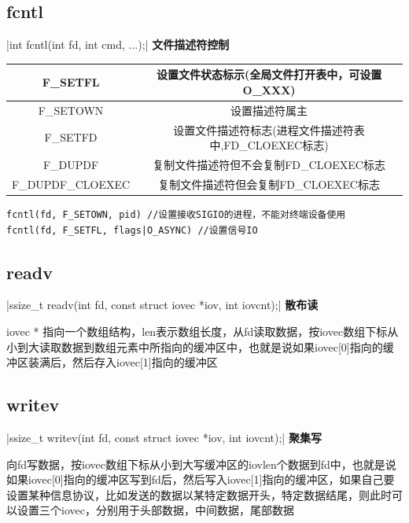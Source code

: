 \subsection{fcntl}
|int fcntl(int fd, int cmd, ...);|
\noindent \textbf{文件描述符控制}
\begin{spacing}{2.0}
\begin{table}[!htb]
	\begin{tabular}{|c|c|}
	\hline
		F\_SETFL & 设置文件状态标示(全局文件打开表中，可设置O\_XXX) \\
	\hline
		F\_SETOWN & 设置描述符属主 \\
	\hline
		F\_SETFD & 设置文件描述符标志(进程文件描述符表中,FD\_CLOEXEC标志)\\
	\hline
		F\_DUPDF & 复制文件描述符但不会复制FD\_CLOEXEC标志\\
	\hline
		F\_DUPDF\_CLOEXEC & 复制文件描述符但会复制FD\_CLOEXEC标志 \\
	\hline
	\end{tabular}
\end{table}
\begin{verbatim}
fcntl(fd, F_SETOWN, pid) //设置接收SIGIO的进程，不能对终端设备使用
fcntl(fd, F_SETFL, flags|O_ASYNC) //设置信号IO
\end{verbatim} 
\end{spacing}
\newpage

\subsection{readv}
|ssize_t readv(int fd, const struct iovec *iov, int iovcnt);|
\noindent \textbf{散布读}
\begin{spacing}{2.0}
iovec * 指向一个数组结构，len表示数组长度，从fd读取数据，按iovec数组下标从小到大读取数据到数组元素中所指向的缓冲区中，也就是说如果iovec[0]指向的缓冲区装满后，然后存入iovec[1]指向的缓冲区
\end{spacing}
\newpage

\subsection{writev}
|ssize_t writev(int fd, const struct iovec *iov, int iovcnt);|
\noindent \textbf{聚集写}
\begin{spacing}{2.0}
向fd写数据，按iovec数组下标从小到大写缓冲区的iov\li len个数据到fd中，也就是说如果iovec[0]指向的缓冲区写到fd后，然后写入iovec[1]指向的缓冲区，如果自己要设置某种信息协议，比如发送的数据以某特定数据开头，特定数据结尾，则此时可以设置三个iovec，分别用于头部数据，中间数据，尾部数据
\end{spacing}
\newpage

